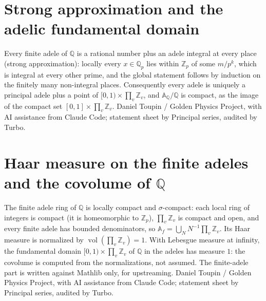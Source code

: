 \documentclass{report}
\theoremstyle{definition}
\begin{document}
\begin{itemize}
\begin{itemize}
\section{Strong approximation and the adelic fundamental domain}
Every finite adele of $\mathbb Q$ is a rational number plus an adele integral at every place (strong approximation): locally every $x\in\mathbb Q_p$ lies within $\mathbb Z_p$ of some $m/p^k$, which is integral at every other prime, and the global statement follows by induction on the finitely many non-integral places. Consequently every adele is uniquely a principal adele plus a point of $[0,1)\times\prod_v\mathbb Z_v$, and $\mathbb A_{\mathbb Q}/\mathbb Q$ is compact, as the image of the compact set $[0,1]\times\prod_v\mathbb Z_v$.
Daniel Toupin / Golden Physics Project, with AI assistance from Claude Code; statement sheet by Principal series, audited by Turbo.

\section{Haar measure on the finite adeles and the covolume of $\mathbb Q$}
The finite adele ring of $\mathbb Q$ is locally compact and $\sigma$-compact: each local ring of integers is compact (it is homeomorphic to $\mathbb Z_p$), $\prod_v\mathbb Z_v$ is compact and open, and every finite adele has bounded denominators, so $\mathbb A_f=\bigcup_N N^{-1}\prod_v\mathbb Z_v$. Its Haar measure is normalized by $\operatorname{vol}(\prod_v\mathbb Z_v)=1$. With Lebesgue measure at infinity, the fundamental domain $[0,1)\times\prod_v\mathbb Z_v$ of $\mathbb Q$ in the adeles has measure $1$: the covolume is computed from the normalizations, not assumed. The finite-adele part is written against Mathlib only, for upstreaming.
Daniel Toupin / Golden Physics Project, with AI assistance from Claude Code; statement sheet by Principal series, audited by Turbo.


\end{itemize}
\end{itemize}
\end{document}
